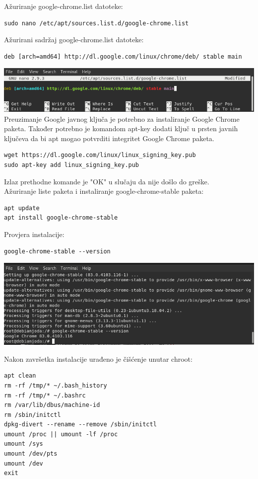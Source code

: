 \documentclass[12pt,vi]{mitthesis}
\begin{document}
\noindent
Ažuriranje google-chrome.list datoteke:
\begin{lstlisting}[style=BashInputStyle]
sudo nano /etc/apt/sources.list.d/google-chrome.list
\end{lstlisting}
Ažurirani sadržaj google-chrome.list datoteke:
\begin{lstlisting}[style=BashInputStyle]
deb [arch=amd64] http://dl.google.com/linux/chrome/deb/ stable main
\end{lstlisting}
\includegraphics[width=\linewidth]{images/google-chrome-list.png} 
\noindent
Preuzimanje Google javnog ključa je potrebno za instaliranje Google Chrome paketa. Također potrebno je komandom apt-key dodati ključ u prsten javnih ključeva da bi apt mogao potvrditi integritet Google Chrome paketa.\\
\begin{lstlisting}[style=BashInputStyle]
wget https://dl.google.com/linux/linux_signing_key.pub
sudo apt-key add linux_signing_key.pub
\end{lstlisting}
\noindent
Izlaz prethodne komande je "OK" u slučaju da nije došlo do greške.\\
\indent
Ažuriranje liste paketa i instaliranje google-chrome-stable paketa:
\begin{lstlisting}[style=BashInputStyle]
apt update
apt install google-chrome-stable
\end{lstlisting}
\noindent
Provjera instalacije:
\begin{lstlisting}[style=BashInputStyle]
google-chrome-stable --version
\end{lstlisting}
\includegraphics[width=\linewidth]{images/googlechromestableversion.png} 

\noindent
Nakon završetka instalacije urađeno je čišćenje unutar chroot:
\begin{lstlisting}[style=BashInputStyle]
apt clean
rm -rf /tmp/* ~/.bash_history
rm -rf /tmp/* ~/.bashrc
rm /var/lib/dbus/machine-id
rm /sbin/initctl
dpkg-divert --rename --remove /sbin/initctl
umount /proc || umount -lf /proc
umount /sys
umount /dev/pts
umount /dev
exit
\end{lstlisting}
\end{document}
